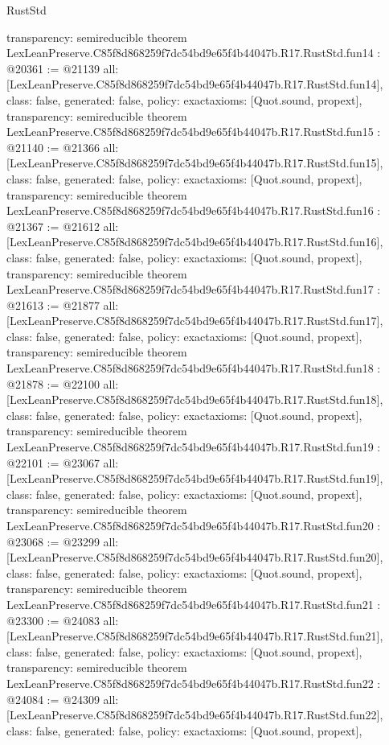 \begin{lexlean}{RustStd}
\begin{coremodule}
{  transparency: semireducible
}
theorem LexLeanPreserve.C85f8d868259f7dc54bd9e65f4b44047b.R17.RustStd.fun14 : @20361 := @21139 {
  all: [LexLeanPreserve.C85f8d868259f7dc54bd9e65f4b44047b.R17.RustStd.fun14],
  class: false,
  generated: false,
  policy: exact{axioms: [Quot.sound, propext]},
  transparency: semireducible
}
theorem LexLeanPreserve.C85f8d868259f7dc54bd9e65f4b44047b.R17.RustStd.fun15 : @21140 := @21366 {
  all: [LexLeanPreserve.C85f8d868259f7dc54bd9e65f4b44047b.R17.RustStd.fun15],
  class: false,
  generated: false,
  policy: exact{axioms: [Quot.sound, propext]},
  transparency: semireducible
}
theorem LexLeanPreserve.C85f8d868259f7dc54bd9e65f4b44047b.R17.RustStd.fun16 : @21367 := @21612 {
  all: [LexLeanPreserve.C85f8d868259f7dc54bd9e65f4b44047b.R17.RustStd.fun16],
  class: false,
  generated: false,
  policy: exact{axioms: [Quot.sound, propext]},
  transparency: semireducible
}
theorem LexLeanPreserve.C85f8d868259f7dc54bd9e65f4b44047b.R17.RustStd.fun17 : @21613 := @21877 {
  all: [LexLeanPreserve.C85f8d868259f7dc54bd9e65f4b44047b.R17.RustStd.fun17],
  class: false,
  generated: false,
  policy: exact{axioms: [Quot.sound, propext]},
  transparency: semireducible
}
theorem LexLeanPreserve.C85f8d868259f7dc54bd9e65f4b44047b.R17.RustStd.fun18 : @21878 := @22100 {
  all: [LexLeanPreserve.C85f8d868259f7dc54bd9e65f4b44047b.R17.RustStd.fun18],
  class: false,
  generated: false,
  policy: exact{axioms: [Quot.sound, propext]},
  transparency: semireducible
}
theorem LexLeanPreserve.C85f8d868259f7dc54bd9e65f4b44047b.R17.RustStd.fun19 : @22101 := @23067 {
  all: [LexLeanPreserve.C85f8d868259f7dc54bd9e65f4b44047b.R17.RustStd.fun19],
  class: false,
  generated: false,
  policy: exact{axioms: [Quot.sound, propext]},
  transparency: semireducible
}
theorem LexLeanPreserve.C85f8d868259f7dc54bd9e65f4b44047b.R17.RustStd.fun20 : @23068 := @23299 {
  all: [LexLeanPreserve.C85f8d868259f7dc54bd9e65f4b44047b.R17.RustStd.fun20],
  class: false,
  generated: false,
  policy: exact{axioms: [Quot.sound, propext]},
  transparency: semireducible
}
theorem LexLeanPreserve.C85f8d868259f7dc54bd9e65f4b44047b.R17.RustStd.fun21 : @23300 := @24083 {
  all: [LexLeanPreserve.C85f8d868259f7dc54bd9e65f4b44047b.R17.RustStd.fun21],
  class: false,
  generated: false,
  policy: exact{axioms: [Quot.sound, propext]},
  transparency: semireducible
}
theorem LexLeanPreserve.C85f8d868259f7dc54bd9e65f4b44047b.R17.RustStd.fun22 : @24084 := @24309 {
  all: [LexLeanPreserve.C85f8d868259f7dc54bd9e65f4b44047b.R17.RustStd.fun22],
  class: false,
  generated: false,
  policy: exact{axioms: [Quot.sound, propext]},
}
\end{coremodule}
\end{lexlean}
